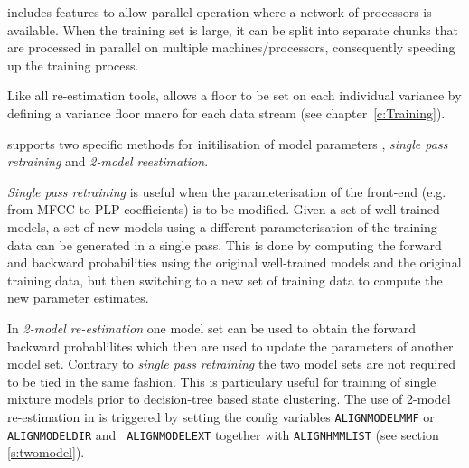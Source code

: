  includes features to allow parallel operation where a network
of processors is available. When the training set is large, it can be split into separate chunks that are processed in parallel on multiple machines/processors, consequently speeding up the training process. 

Like all re-estimation tools,  allows
a floor to be set on each individual variance by defining a variance floor
macro for each data stream (see chapter~\ref{c:Training}).

 supports two specific methods for initilisation of
model parameters , \textit{single pass retraining} and \textit{2-model
  reestimation}.

\textit{Single pass retraining} is useful when the parameterisation of
the front-end (e.g. from MFCC to PLP coefficients) is to be modified.
Given a set of well-trained models, a set of new models using a
different parameterisation of the training data can be generated in a
single pass.  This is done by computing the forward and backward
probabilities using the original well-trained models and the original
training data, but then switching to a new set of training data to
compute the new parameter estimates.

In \textit{2-model re-estimation} one model set can be used to obtain
the forward backward probablilites which then are used to update the
parameters of another model set. Contrary to \textit{single pass
  retraining} the two model sets are not required to be tied in the
same fashion.  This is particulary useful for training of single
mixture models prior to decision-tree based state clustering. The use
of 2-model re-estimation in  is triggered by setting the
config variables {\tt ALIGNMODELMMF} or {\tt ALIGNMODELDIR} and {\tt
  ALIGNMODELEXT} together with {\tt ALIGNHMMLIST} (see section \ref{s:twomodel}).

